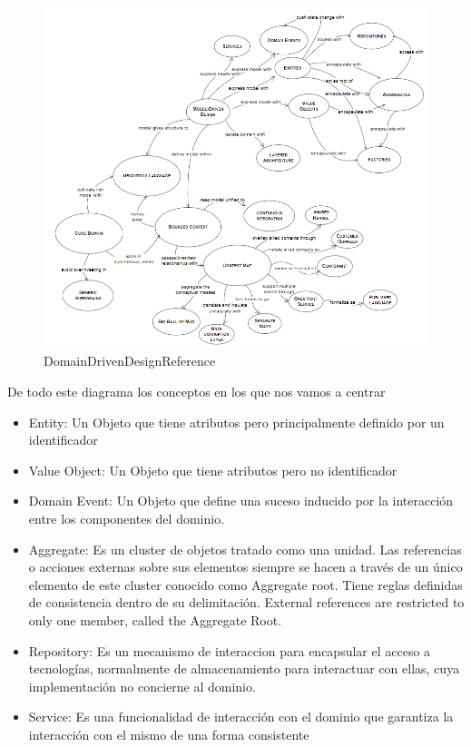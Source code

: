 \begin{figure}[H]
    \centering
    \includegraphics[height=0.5\textheight]{./part/Proyecto_ejecutivo/memoria_descriptiva/infoPreviaAntecedentes/img/DomainDrivenDesignReference}
    \caption{DomainDrivenDesignReference\cite{EricEvans2003DDTC}}\label{fig:DomainDrivenDesignReference}
\end{figure}

De todo este diagrama los conceptos en los que nos vamos a centrar

\begin{itemize}
    \item Entity: Un Objeto que tiene atributos pero principalmente definido por un identificador
    \item Value Object: Un Objeto que tiene atributos pero no identificador
    \item Domain Event: Un Objeto que define una suceso inducido por la interacción entre los componentes del dominio.
    \item Aggregate: Es un cluster de objetos tratado como una unidad. Las referencias o acciones externas sobre sus elementos siempre se hacen a través de un único elemento de este cluster conocido como Aggregate root. Tiene reglas definidas de consistencia dentro de su delimitación. External references are restricted to only one member, called the Aggregate Root.
    \item Repository: Es un mecanismo de interaccion para encapsular el acceso a tecnologías, normalmente de almacenamiento para interactuar con ellas, cuya implementación no concierne al dominio.
    \item Service: Es una funcionalidad de interacción con el dominio que garantiza la interacción con el mismo de una forma consistente
\end{itemize}


